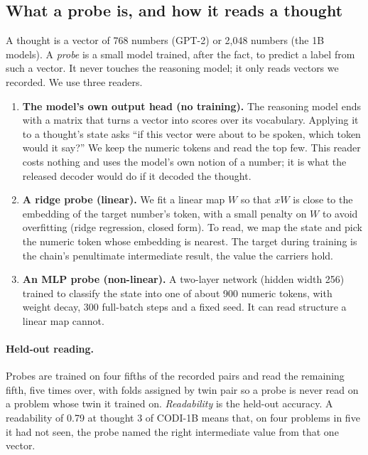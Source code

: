 \documentclass{article}
\begin{document}
\subsection{What a probe is, and how it reads a thought}\label{sec:probes}

A thought is a vector of 768 numbers (GPT-2) or 2{,}048 numbers (the 1B models). A \emph{probe} is a small model trained, after the fact, to predict a label from such a vector. It never touches the reasoning model; it only reads vectors we recorded. We use three readers.

\begin{enumerate}
  \item \textbf{The model's own output head (no training).} The reasoning model ends with a matrix that turns a vector into scores over its vocabulary. Applying it to a thought's state asks ``if this vector were about to be spoken, which token would it say?'' We keep the numeric tokens and read the top few. This reader costs nothing and uses the model's own notion of a number; it is what the released decoder would do if it decoded the thought.
  \item \textbf{A ridge probe (linear).} We fit a linear map $W$ so that $xW$ is close to the embedding of the target number's token, with a small penalty on $W$ to avoid overfitting (ridge regression, closed form). To read, we map the state and pick the numeric token whose embedding is nearest. The target during training is the chain's penultimate intermediate result, the value the carriers hold.
  \item \textbf{An MLP probe (non-linear).} A two-layer network (hidden width 256) trained to classify the state into one of about 900 numeric tokens, with weight decay, 300 full-batch steps and a fixed seed. It can read structure a linear map cannot.
\end{enumerate}

\paragraph{Held-out reading.} Probes are trained on four fifths of the recorded pairs and read the remaining fifth, five times over, with folds assigned by twin pair so a probe is never read on a problem whose twin it trained on. \emph{Readability} is the held-out accuracy. A readability of 0.79 at thought 3 of CODI-1B means that, on four problems in five it had not seen, the probe named the right intermediate value from that one vector.
\end{document}
